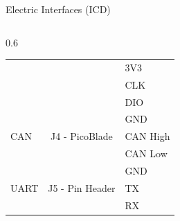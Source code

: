 \begin{frame}{Electric Interfaces (ICD)}
\begin{columns}[t]
\begin{column}[t]{0.6\textwidth}
\begin{table}[!htb]
\begin{tabular}{lcl}
                                                  &                     & 3V3 \\
                                                  &                     & CLK \\
                                                  &                     & DIO \\
                    \midrule
                    \multirow{3}{*}{CAN}          & \multirow{3}{*}{J4 - PicoBlade} & GND \\
                                                  &                     & CAN High \\
                                                  &                     & CAN Low \\
                    \midrule
                    \multirow{3}{*}{UART}         & \multirow{3}{*}{J5 - Pin Header} & GND \\
                                                  &                     & TX \\
                                                  &                     & RX \\
                    \bottomrule[1.5pt]
                \end{tabular}
            \end{table}
        \end{column}
    \end{columns}

\end{frame}


